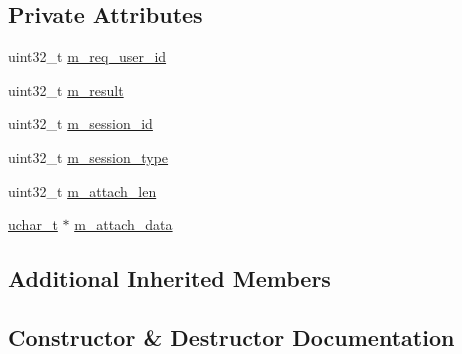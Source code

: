 \subsection*{Private Attributes}
\begin{DoxyCompactItemize}
\item 
uint32\+\_\+t \hyperlink{class_c_im_pdu_remove_session_response_abd671bd7763f4a2620c3b1e99db63274}{m\+\_\+req\+\_\+user\+\_\+id}
\item 
uint32\+\_\+t \hyperlink{class_c_im_pdu_remove_session_response_a7e069cf99c081ec5356ea87502a6e731}{m\+\_\+result}
\item 
uint32\+\_\+t \hyperlink{class_c_im_pdu_remove_session_response_a41b8afa60395fde2990b9530c5d90f15}{m\+\_\+session\+\_\+id}
\item 
uint32\+\_\+t \hyperlink{class_c_im_pdu_remove_session_response_a349393a53f9f7225df445c45e8839308}{m\+\_\+session\+\_\+type}
\item 
uint32\+\_\+t \hyperlink{class_c_im_pdu_remove_session_response_a5cf08c02cf93115722f1056ca82d77e9}{m\+\_\+attach\+\_\+len}
\item 
\hyperlink{base_2ostype_8h_a124ea0f8f4a23a0a286b5582137f0b8d}{uchar\+\_\+t} $\ast$ \hyperlink{class_c_im_pdu_remove_session_response_ae58923c55ed30a8d91a3abd60950938c}{m\+\_\+attach\+\_\+data}
\end{DoxyCompactItemize}
\subsection*{Additional Inherited Members}


\subsection{Constructor \& Destructor Documentation}
\hypertarget{class_c_im_pdu_remove_session_response_a754db006cbed36b68595744044231943}{}
